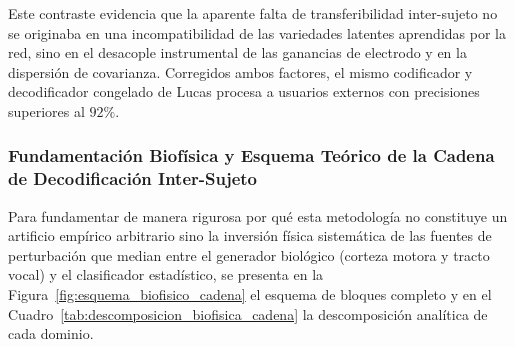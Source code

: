 \documentclass[11pt,a4paper]{article}
\begin{document}
Este contraste evidencia que la aparente falta de transferibilidad inter-sujeto no se originaba en una incompatibilidad de las variedades latentes aprendidas por la red, sino en el desacople instrumental de las ganancias de electrodo y en la dispersión de covarianza. Corregidos ambos factores, el mismo codificador y decodificador congelado de Lucas procesa a usuarios externos con precisiones superiores al $92\%$.

\subsubsection{Fundamentación Biofísica y Esquema Teórico de la Cadena de Decodificación Inter-Sujeto}
\label{subsubsec:fundamentacion_biofisica_teorica}

Para fundamentar de manera rigurosa por qué esta metodología no constituye un artificio empírico arbitrario sino la inversión física sistemática de las fuentes de perturbación que median entre el generador biológico (corteza motora y tracto vocal) y el clasificador estadístico, se presenta en la Figura~\ref{fig:esquema_biofisico_cadena} el esquema de bloques completo y en el Cuadro~\ref{tab:descomposicion_biofisica_cadena} la descomposición analítica de cada dominio.
\end{document}
